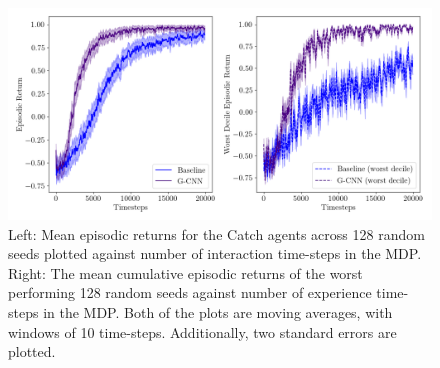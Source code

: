 %
\begin{figure}
	\centering
	\includegraphics[width=\linewidth]{Figures/catch_returns.png}
	\caption{Left: Mean episodic returns for the Catch agents across 128 random seeds plotted against number of interaction time-steps in the MDP. Right: The mean cumulative episodic returns of the worst performing 128 random seeds against number of experience time-steps in the MDP. Both of the plots are moving averages, with windows of 10 time-steps. Additionally, two standard errors are plotted.}
\end{figure}
